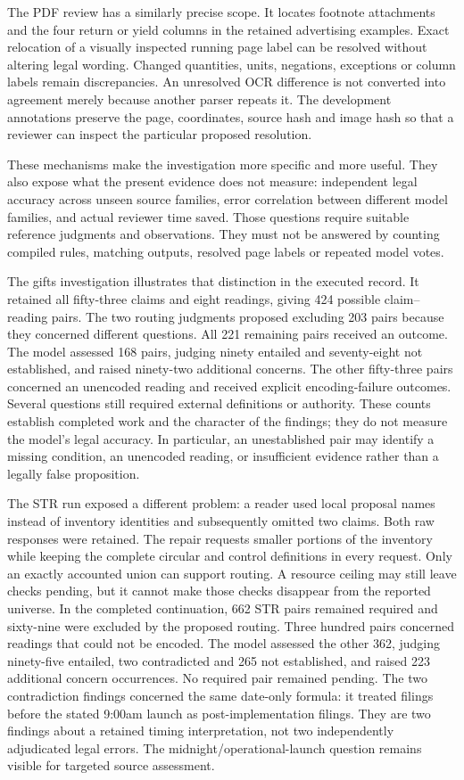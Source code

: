 \documentclass[12pt,a4paper,oneside,openany]{book}
\begin{document}
The PDF review has a similarly precise scope. It locates footnote attachments
and the four return or yield columns in the retained advertising examples.
Exact relocation of a visually inspected running page label can be resolved
without altering legal wording. Changed quantities, units, negations, exceptions
or column labels remain discrepancies. An unresolved OCR difference is not
converted into agreement merely because another parser repeats it. The
development annotations preserve the page, coordinates, source hash and image
hash so that a reviewer can inspect the particular proposed resolution.

These mechanisms make the investigation more specific and more useful. They
also expose what the present evidence does not measure: independent legal
accuracy across unseen source families, error correlation between different
model families, and actual reviewer time saved. Those questions require suitable
reference judgments and observations. They must not be answered by counting
compiled rules, matching outputs, resolved page labels or repeated model votes.

The gifts investigation illustrates that distinction in the executed record.
It retained all fifty-three claims and eight readings, giving 424 possible
claim--reading pairs. The two routing judgments proposed excluding 203 pairs
because they concerned different questions. All 221 remaining pairs received an
outcome. The model assessed 168 pairs, judging ninety entailed and seventy-eight
not established, and raised ninety-two additional concerns. The other fifty-three
pairs concerned an unencoded reading and received explicit encoding-failure
outcomes. Several questions still required external definitions or
authority. These counts establish completed work and the character of the
findings; they do not measure the model's legal accuracy. In particular, an
unestablished pair may identify a missing condition, an unencoded reading, or
insufficient evidence rather than a legally false proposition.

The STR run exposed a different problem: a reader used local proposal names
instead of inventory identities and subsequently omitted two claims. Both raw
responses were retained. The repair requests smaller portions of the inventory
while keeping the complete circular and control definitions in every request.
Only an exactly accounted union can support routing. A resource ceiling may
still leave checks pending, but it cannot make those checks disappear from the
reported universe. In the completed continuation, 662 STR pairs remained
required and sixty-nine were excluded by the proposed routing. Three hundred
pairs concerned readings that could not be encoded. The model assessed the other
362, judging ninety-five entailed, two contradicted and 265 not established, and
raised 223 additional concern occurrences. No required pair remained pending.
The two contradiction findings concerned the same date-only formula: it treated
filings before the stated 9:00am launch as post-implementation filings. They are
two findings about a retained timing interpretation, not two independently
adjudicated legal errors. The midnight/operational-launch question remains
visible for targeted source assessment.
\end{document}
